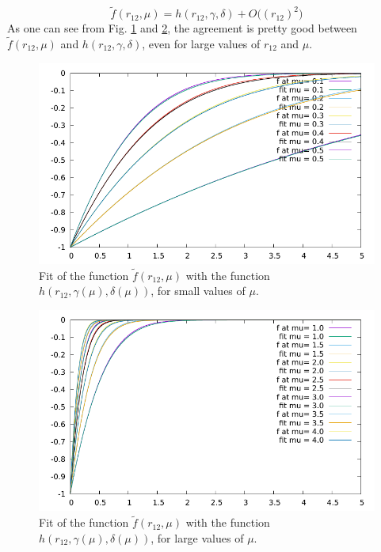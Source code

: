 \documentclass[aip,jcp,reprint,noshowkeys,superscriptaddress]{revtex4-1}
\begin{document}
\begin{equation}
 \label{fit_f_h}
  \tilde{f}(r_{12},\mu) = h(r_{12},\gamma,\delta) + O\big((r_{12})^2\big)
\end{equation}
As one can see from Fig. \ref{fit_small_mu} and \ref{fit_large_mu}, the agreement is pretty good between $\tilde{f}(r_{12},\mu)$ and $h(r_{12},\gamma,\delta)$, even for large values of $r_{12}$ and $\mu$. 
\begin{figure}
 \label{fit_small_mu}
        \includegraphics[width=1.00\linewidth]{fit_f_small.pdf}
        \caption{Fit of the function $\tilde{f}(r_{12},\mu)$ with the function $h(r_{12},\gamma(\mu),\delta(\mu))$, for small values of $\mu$. }
\end{figure}
\begin{figure}
 \label{fit_large_mu}
        \includegraphics[width=1.00\linewidth]{fit_f_large.pdf}
        \caption{Fit of the function $\tilde{f}(r_{12},\mu)$ with the function $h(r_{12},\gamma(\mu),\delta(\mu))$, for large values of $\mu$. }
\end{figure}
\end{document}
